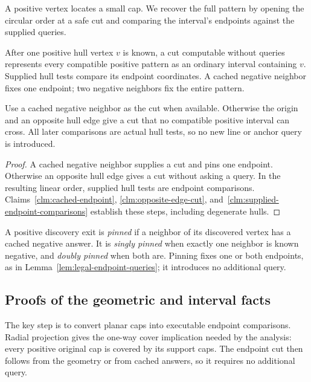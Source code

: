 A positive vertex locates a small cap. We recover the full pattern by
opening the circular order at a safe cut and comparing the interval's
endpoints against the supplied queries.

\begin{lemma}
\label{lem:legal-endpoint-queries}
After one positive hull vertex $v$ is known, a cut computable without
queries represents every compatible positive pattern as an ordinary
interval containing $v$. Supplied hull tests compare its endpoint
coordinates. A cached negative neighbor fixes one endpoint; two
negative neighbors fix the entire pattern.
\end{lemma}
\begin{proofstrategy}
Use a cached negative neighbor as the cut when available. Otherwise
the origin and an opposite hull edge give a cut that no compatible
positive interval can cross. All later comparisons are actual hull
tests, so no new line or anchor query is introduced.
\end{proofstrategy}
\begin{proof}
A cached negative neighbor supplies a cut and pins one endpoint.
Otherwise an opposite hull edge gives a cut without asking a query.
In the resulting linear order, supplied hull tests are endpoint
comparisons. Claims~\ref{clm:cached-endpoint},
\ref{clm:opposite-edge-cut}, and~\ref{clm:supplied-endpoint-comparisons}
establish these steps, including degenerate hulls.
\end{proof}

A positive discovery exit is \emph{pinned} if a neighbor of its
discovered vertex has a cached negative answer. It is
\emph{singly pinned} when exactly one neighbor is known negative,
and \emph{doubly pinned} when both are. Pinning fixes one or both
endpoints, as in Lemma~\ref{lem:legal-endpoint-queries}; it introduces no additional query.




\subsection{Proofs of the geometric and interval facts}

The key step is to convert planar caps into executable endpoint
comparisons. Radial projection gives the one-way cover implication
needed by the analysis: every positive original cap is covered by its
support caps. The endpoint cut then follows from the geometry or from
cached answers, so it requires no additional query.

